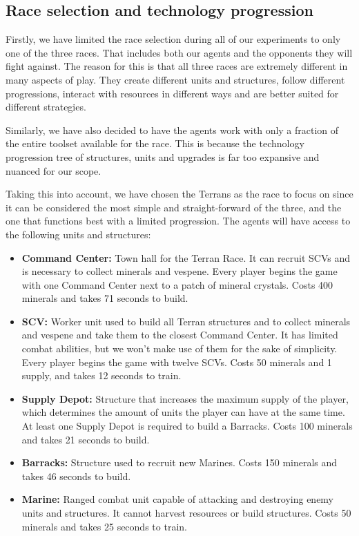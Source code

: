 \subsection{Race selection and technology progression}

Firstly, we have limited the race selection during all of our experiments to only one of the three races. That includes both our agents and the opponents they will fight against. The reason for this is that all three races are extremely different in many aspects of play. They create different units and structures, follow different progressions, interact with resources in different ways and are better suited for different strategies.

Similarly, we have also decided to have the agents work with only a fraction of the entire toolset available for the race. This is because the technology progression tree of structures, units and upgrades is far too expansive and nuanced for our scope.

Taking this into account, we have chosen the Terrans as the race to focus on since it can be considered the most simple and straight-forward of the three, and the one that functions best with a limited progression. The agents will have access to the following units and structures:

\begin{itemize}
    \item \textbf{Command Center:} Town hall for the Terran Race. It can recruit SCVs and is necessary to collect minerals and vespene. Every player begins the game with one Command Center next to a patch of mineral crystals. Costs 400 minerals and takes 71 seconds to build.
    \item \textbf{SCV:} Worker unit used to build all Terran structures and to collect minerals and vespene and take them to the closest Command Center. It has limited combat abilities, but we won't make use of them for the sake of simplicity. Every player begins the game with twelve SCVs. Costs 50 minerals and 1 supply, and takes 12 seconds to train.
    \item \textbf{Supply Depot:} Structure that increases the maximum supply of the player, which determines the amount of units the player can have at the same time. At least one Supply Depot is required to build a Barracks. Costs 100 minerals and takes 21 seconds to build.
    \item \textbf{Barracks:} Structure used to recruit new Marines. Costs 150 minerals and takes 46 seconds to build.
    \item \textbf{Marine:} Ranged combat unit capable of attacking and destroying enemy units and structures. It cannot harvest resources or build structures. Costs 50 minerals and takes 25 seconds to train.
\end{itemize}

